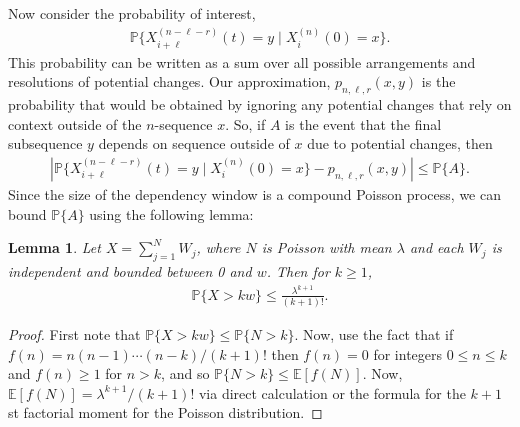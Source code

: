 \documentclass{article}
\newcommand{\E}{\mathbb{E}}
\renewcommand{\P}{\mathbb{P}}
\theoremstyle{plain}
\newtheorem{lemma}{Lemma}
\theoremstyle{definition}
\begin{document}
Now consider the probability of interest,
\begin{align*}
    \P\{ X_{i+\ell}^{(n-\ell-r)}(t) = y \mid X_i^{(n)}(0) = x \} .
\end{align*}
This probability can be written as a sum over all possible arrangements
and resolutions of potential changes.
Our approximation, $p_{n,\ell,r}(x,y)$ is the probability that would be obtained
by ignoring any potential changes that rely on context outside of the $n$-sequence $x$.
So, if $A$ is the event that the final subsequence $y$
depends on sequence outside of $x$ due to potential changes,
then
\begin{align*}
    \left|
        \P\{ X_{i+\ell}^{(n-\ell-r)}(t) = y \mid X_i^{(n)}(0) = x \}
        -
        p_{n,\ell,r}(x,y)
    \right|
    \le \P\{A\} .
\end{align*}
Since the size of the dependency window is a compound Poisson process,
we can bound $\P\{A\}$ using the following lemma:

\begin{lemma}
    Let $X = \sum_{j=1}^N W_j$,
    where $N$ is Poisson with mean $\lambda$
    and each $W_j$ is independent and bounded between 0 and $w$.
    Then for $k \ge 1$,
    \begin{align}
        \P\{ X > k w \}
        \le
        \frac{\lambda^{k+1}}{(k+1)!} .
    \end{align}
\end{lemma}

%

\begin{proof}
    First note that $\P\{X > kw\} \le \P\{N > k\}$.
    Now, use the fact that if $f(n) = n (n-1) \cdots (n-k) / (k+1)!$
    then $f(n) = 0$ for integers $0 \le n \le k$ and $f(n) \ge 1$ for $n > k$,
    and so $\P\{N > k\} \le \E[f(N)]$.
    Now, $\E[f(N)] = \lambda^{k+1} / (k+1)!$ via direct calculation or the
    formula for the $k+1$st factorial moment for the Poisson distribution.
\end{proof}
\end{document}
